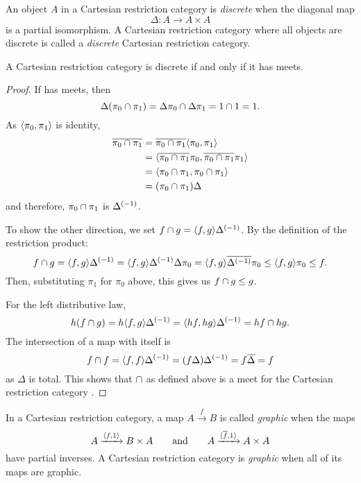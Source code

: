 \begin{definition}\label{def:discrete_object_and_discrete_cartesian}
  An object $A$ in a Cartesian restriction category is \emph{discrete}
  when the diagonal map
  \[
    \Delta:A \to A \times A
  \]
  is a partial isomorphism.
  A  Cartesian restriction category where all objects are
  discrete is called a \emph{discrete} Cartesian restriction category.
\end{definition}

\begin{theorem}\label{thm:a_crc_is_discrete_iff_it_has_meets}
  A Cartesian restriction category \X is discrete if and only if it has meets.
\end{theorem}
\begin{proof}
  If \X has meets, then
  \[
    \Delta(\pi_0 \cap \pi_1) = \Delta\pi_0 \cap \Delta\pi_1 = 1\cap 1 = 1.
  \]
  As $\langle\pi_0,\pi_1\rangle$ is identity,
  \begin{align*}
    \overline{\pi_0 \cap \pi_1} &= \overline{\pi_0 \cap \pi_1} \langle\pi_0, \pi_1\rangle \\
    &=\langle\overline{\pi_0 \cap \pi_1}\pi_0, \overline{\pi_0 \cap \pi_1}\pi_1\rangle\\
    &=\langle\pi_0 \cap \pi_1,\pi_0 \cap \pi_1\rangle\\
    &=(\pi_0 \cap \pi_1 )\Delta
  \end{align*}
  and therefore, $\pi_0 \cap \pi_1$ is ${\Delta}^{(-1)}$.

  To show the other direction, we set $f\cap g = \langle f,g\rangle{\Delta}^{(-1)}$.
  By the definition of the restriction product:
  \[
    f \cap g =  \langle f,g\rangle{\Delta}^{(-1)} =\langle f,g\rangle{\Delta}^{(-1)} \Delta \pi_0 =
      \langle f,g\rangle\overline{{\Delta}^{(-1)}}\pi_0 \le \langle f,g\rangle\pi_0 \le f.
  \]
  Then, substituting $\pi_1$ for $\pi_0$ above, this gives us $f \cap g \le g$.

  For the left distributive law,
  \[
    h(f \cap g) = h \langle f,g\rangle{\Delta}^{(-1)} =  \langle h f,h g\rangle{\Delta}^{(-1)} = h f \cap h g.
  \]
  The intersection of a map with itself is
  \[
    f\cap f = \langle f,f\rangle {\Delta}^{(-1)} = (f \Delta) {\Delta}^{(-1)} = f \overline{\Delta} = f
  \]
  as $\Delta$ is total. This shows that $\cap$ as defined above is a meet for the
  Cartesian restriction category \X.

\end{proof}

\begin{definition}\label{def:graphic_map}
  In a Cartesian restriction category, a map $A\xrightarrow{f}B$ is called \emph{graphic} when the
  maps
  \[
    A\xrightarrow{\langle f,1\rangle}B\times A\qquad \text{and}\qquad
    A\xrightarrow{\langle\overline{f},1\rangle}A\times A
  \]
  have partial inverses. A Cartesian restriction category is \emph{graphic} when all of its maps
  are graphic.
\end{definition}

